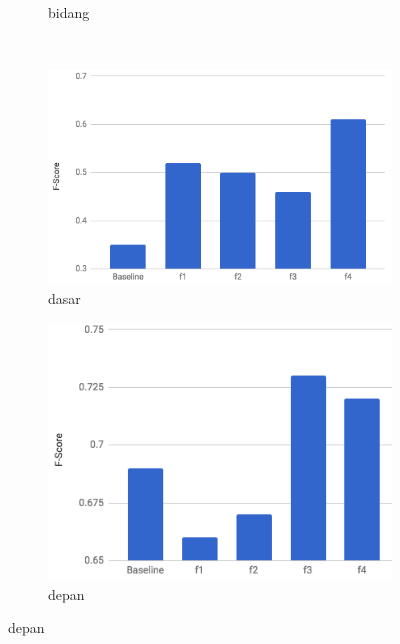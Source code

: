 \begin{figure}[H]
\begin{subfigure}{.5\textwidth}
		\caption{bidang}
	\end{subfigure}%
	\\
	\begin{subfigure}{.5\textwidth}
		\centering
		\includegraphics[width=1\linewidth]{adit_pics/dasar.png}
		\caption{dasar}
	\end{subfigure}%
	\begin{subfigure}{.5\textwidth}
		\centering
		\includegraphics[width=1\linewidth]{adit_pics/depan.png}
		\caption{depan}
	\end{subfigure}%
\end{figure}
\clearpage

